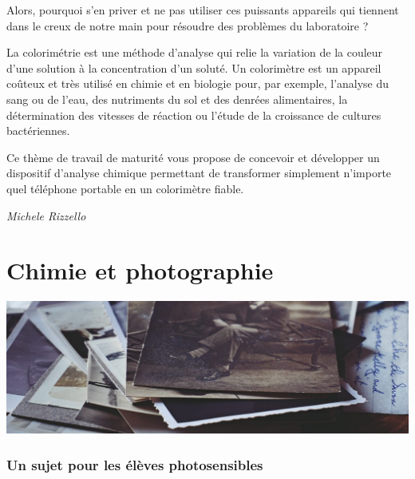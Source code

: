 \documentclass[
  10pt,
  french,
  a5paper,
  openany]{book}
\newenvironment{signature}{\begin{flushright}}{\end{flushright}}
\begin{document}
Alors, pourquoi s'en priver et ne pas utiliser ces puissants appareils qui tiennent dans le creux de notre main pour résoudre des problèmes du laboratoire ?

La colorimétrie est une méthode d'analyse qui relie la variation de la couleur d'une solution à la concentration d'un soluté. Un colorimètre est un appareil coûteux et très utilisé en chimie et en biologie pour, par exemple, l'analyse du sang ou de l'eau, des nutriments du sol et des denrées alimentaires, la détermination des vitesses de réaction ou l'étude de la croissance de cultures bactériennes.

Ce thème de travail de maturité vous propose de concevoir et développer un dispositif d'analyse chimique permettant de transformer simplement n'importe quel téléphone portable en un colorimètre fiable.

\begin{signature}
\emph{Michele Rizzello}

\end{signature}

\hypertarget{chimie-et-photographie}{%
\chapter{Chimie et photographie}\label{chimie-et-photographie}}

\begin{center}
\includegraphics[width=1\textwidth,height=\textheight]{images/chimie-et-photographie.jpg}

\end{center}


\hypertarget{un-sujet-pour-les-uxe9luxe8ves-photosensibles}{%
\subsection*{Un sujet pour les élèves photosensibles}\label{un-sujet-pour-les-uxe9luxe8ves-photosensibles}}
\end{document}

